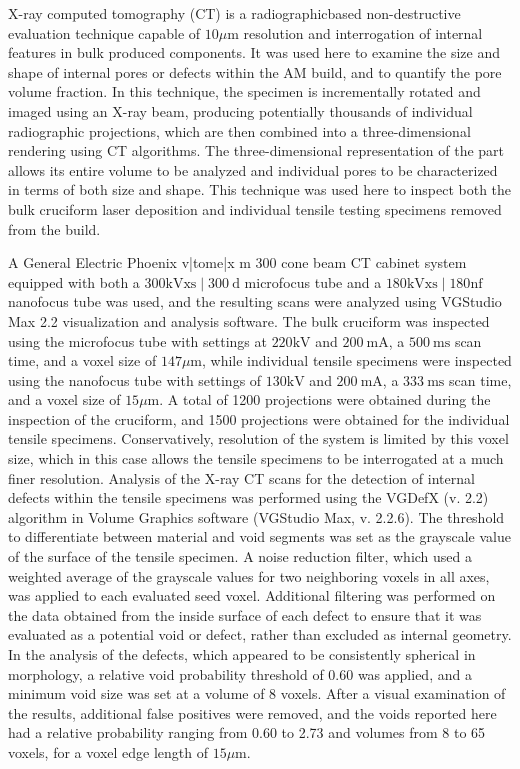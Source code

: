 \documentclass[10pt]{article}
\begin{document}
X-ray computed tomography (CT) is a radiographicbased non-destructive evaluation technique capable of $10 \mu \mathrm{m}$ resolution and interrogation of internal features in bulk produced components. It was used here to examine the size and shape of internal pores or defects within the AM build, and to quantify the pore volume fraction. In this technique, the specimen is incrementally rotated and imaged using an X-ray beam, producing potentially thousands of individual radiographic projections, which are then combined into a three-dimensional rendering using CT algorithms. The three-dimensional representation of the part allows its entire volume to be analyzed and individual pores to be characterized in terms of both size and shape. This technique was used here to inspect both the bulk cruciform laser deposition and individual tensile testing specimens removed from the build.

A General Electric Phoenix v|tome|x m 300 cone beam CT cabinet system equipped with both a $300 \mathrm{kV} \mathrm{xs} \mid 300 \mathrm{~d}$ microfocus tube and a $180 \mathrm{kV} \mathrm{xs} \mid 180 \mathrm{nf}$ nanofocus tube was used, and the resulting scans were analyzed using VGStudio Max 2.2 visualization and analysis software. The bulk cruciform was inspected using the microfocus tube with settings at $220 \mathrm{kV}$ and $200 \mathrm{~mA}$, a $500 \mathrm{~ms}$ scan time, and a voxel size of $147 \mu \mathrm{m}$, while individual tensile specimens were inspected using the nanofocus tube with settings of $130 \mathrm{kV}$ and $200 \mathrm{~mA}$, a $333 \mathrm{~ms}$ scan time, and a voxel size of $15 \mu \mathrm{m}$. A total of 1200 projections were obtained during the inspection of the cruciform, and 1500 projections were obtained for the individual tensile specimens. Conservatively, resolution of the system is limited by this voxel size, which in this case allows the tensile specimens to be interrogated at a much finer resolution. Analysis of the X-ray CT scans for the detection of internal defects within the tensile specimens was performed using the VGDefX (v. 2.2) algorithm in Volume Graphics software (VGStudio Max, v. 2.2.6). The threshold to differentiate between material and void segments was set as the grayscale value of the surface of the tensile specimen. A noise reduction filter, which used a weighted average of the grayscale values for two neighboring voxels in all axes, was applied to each evaluated seed voxel. Additional filtering was performed on the data obtained from the inside surface of each defect to ensure that it was evaluated as a potential void or defect, rather than excluded as internal geometry. In the analysis of the defects, which appeared to be consistently spherical in morphology, a relative void probability threshold of 0.60 was applied, and a minimum void size was set at a volume of 8 voxels. After a visual examination of the results, additional false positives were removed, and the voids reported here had a relative probability ranging from 0.60 to 2.73 and volumes from 8 to 65 voxels, for a voxel edge length of $15 \mu \mathrm{m}$.
\end{document}
